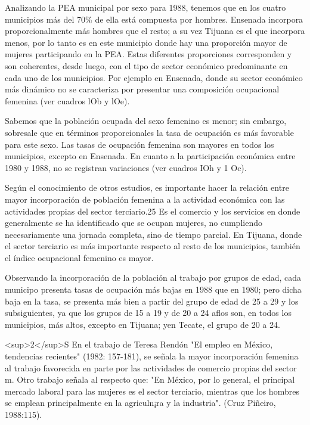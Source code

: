\documentclass{article}
\begin{document}
Analizando la PEA municipal por sexo para 1988, tenemos que en los cuatro municipios más del 70\% de ella está compuesta por hombres. Ensenada incorpora proporcionalmente más hombres que el resto; a su vez Tijuana es el que incorpora menos, por lo tanto es en este municipio donde hay una proporción mayor de mujeres participando en la PEA. Estas diferentes proporciones corresponden y son coherentes, desde luego, con el tipo de sector económico predominante en cada uno de los municipios. Por ejemplo en Ensenada, donde su sector económico más dinámico no se caracteriza por presentar una composición ocupacional femenina (ver cuadros lOb y lOe).

Sabemos que la población ocupada del sexo femenino es menor; sin embargo, sobresale que en términos proporcionales la tasa de ocupación es más favorable para este sexo. Las tasas de ocupación femenina son mayores en todos los municipios, excepto en Ensenada. En cuanto a la participación económica entre 1980 y 1988, no se registran variaciones (ver cuadros IOh y 1 Oc).

Según el conocimiento de otros estudios, es importante hacer la relación entre mayor incorporación de población femenina a la actividad económica con las actividades propias del sector terciario.25 Es el comercio y los servicios en donde generalmente se ha identificado que se ocupan mujeres, no cumpliendo necesariamente una jornada completa, sino de tiempo parcial. En Tijuana, donde el sector terciario es más importante respecto al resto de los municipios, también el índice ocupacional femenino es mayor.

Observando la incorporación de la población al trabajo por grupos de edad, cada municipo presenta tasas de ocupación más bajas en 1988 que en 1980; pero dicha baja en la tasa, se presenta más bien a partir del grupo de edad de 25 a 29 y los subsiguientes, ya que los grupos de 15 a 19 y de 20 a 24 aflos son, en todos los municipios, más altos, excepto en Tijuana; yen Tecate, el grupo de 20 a 24.

<sup>2</sup>S En el trabajo de Teresa Rendón "El empleo en México, tendencias recientes" (1982: 157-181), se señala la mayor incorporación femenina al trabajo favorecida en parte por las actividades de comercio propias del sector m. Otro trabajo señala al respecto que: "En México, por lo general, el principal mercado laboral para las mujeres es el sector terciario, mientras que los hombres se emplean principalmente en la agriculn¡ra y la industria". (Cruz Piñeiro, 1988:115).
\end{document}
